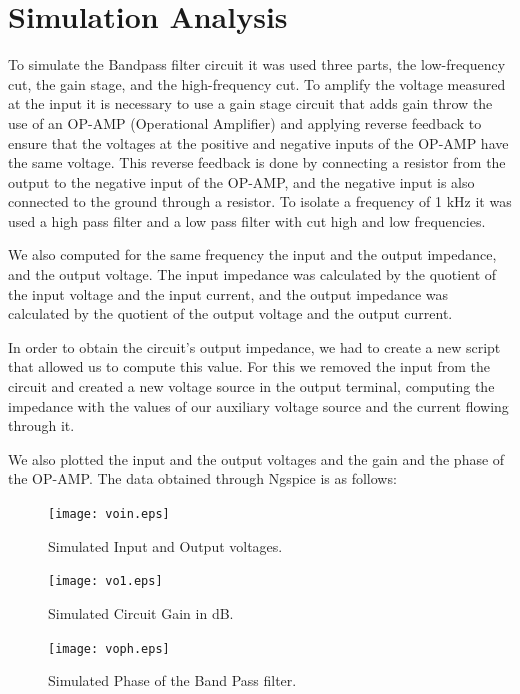 \section{Simulation Analysis}
\label{sec:simulation}
To simulate the Bandpass filter circuit it was used three parts, the low-frequency cut, the gain stage, and the high-frequency cut.
To amplify the voltage measured at the input it is necessary to use a gain stage circuit that adds gain throw the use of an OP-AMP (Operational Amplifier) and applying reverse feedback to ensure that the voltages at the positive and negative inputs of the OP-AMP have the same voltage. This reverse feedback is done by connecting a resistor from the output to the negative input of the OP-AMP, and the negative input is also connected to the ground through a resistor.
To isolate a frequency of 1 kHz it was used a high pass filter and a low pass filter with cut high and low frequencies.

We also computed for the same frequency the input and the output impedance, and the output voltage. The input impedance was calculated by the quotient of the input voltage and the input current, and the output impedance was calculated by the quotient of the output voltage and the output current.

In order to obtain the circuit's output impedance, we had to create a new script that allowed us to compute this value. For this we removed the input from the circuit and created a new voltage source in the output terminal, computing the impedance with the values of our auxiliary voltage source and the current flowing through it.

We also plotted the input and the output voltages and the gain and the phase of the OP-AMP.
The data obtained through Ngspice is as follows:

\begin{figure}[h] 
\centering
\texttt{[image: voin.eps]}
\caption{Simulated Input and Output voltages.}
\label{Fig3: InOutvoltage}
\end{figure}

\begin{figure}[h] 
\centering
\texttt{[image: vo1.eps]}
\caption{Simulated Circuit Gain in dB.}
\label{Fig4: GaindB}
\end{figure}

\begin{figure}[h] 
\centering
\texttt{[image: voph.eps]}
\caption{Simulated Phase of the Band Pass filter.}
\label{Fig5: Phase}
\end{figure}


